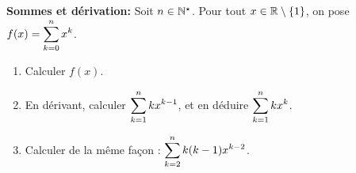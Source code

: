 \documentclass[a4paper, 11pt,reqno]{article}
\begin{document}
\begin{exercice}  \; \textbf{Sommes et d\'erivation:} Soit $n\in\mathbb{N}^{\star}$. Pour tout $x\in\mathbb{R}\setminus\lbrace 1\rbrace$, on pose $f(x)=\displaystyle \sum\limits_{k=0}^n x^k$.
\begin{enumerate}
\item Calculer $f(x)$.
\item En d\'erivant, calculer $\displaystyle \sum\limits_{k=1}^n kx^{k-1}$, et en d\'eduire $\displaystyle \sum\limits_{k=1}^n kx^k$.
\item Calculer de la m\^eme fa\c con : $\displaystyle \sum\limits_{k=2}^n k(k-1)x^{k-2}$.
\end{enumerate}

\end{exercice}
\end{document}
